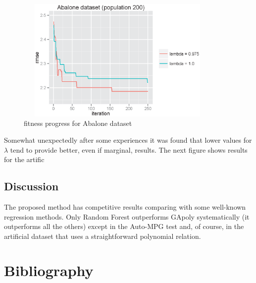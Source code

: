 \documentclass[a4paper, 12pt]{article}
\begin{document}
\begin{figure}[htb]
	\begin{center}
		\includegraphics[height=6cm,width=10cm,angle=0]
			{figures/Abalone_fitnessProgress.eps}
		\caption{fitness progress for Abalone dataset}
	\end{center}
\end{figure}

Somewhat unexpectedly after some experiences it was found that lower values for $\lambda$ tend to provide better, even if marginal, results. The next figure shows results for the artific

\subsection{Discussion}

The proposed method has competitive results comparing with some well-known regression methods. Only Random Forest outperforms GApoly systematically (it outperforms all the others) except in the Auto-MPG test and, of course, in the artificial dataset that uses a straightforward polynomial relation. 



\section{Bibliography}



\end{document}
